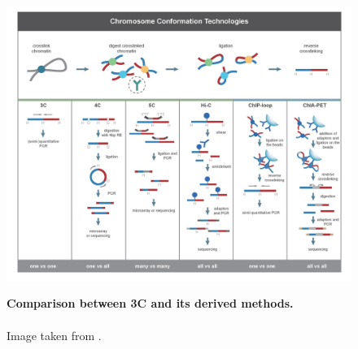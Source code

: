 
\begin{figure}[t]
\begin{centering}
    {\includegraphics[scale=0.75]{figures/background/Chromosome_conformation_techniques.jpg}}
    \caption[Comparison between 3C and its derived methods]
    {\textbf{Comparison between 3C and its derived methods.}
    \\ \\ Image taken from \cite{Li2014}.}
    \label{fig:comparison3C}\label{fig:cct}
\end{centering}
\end{figure}



